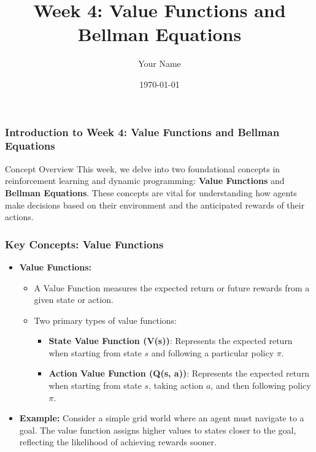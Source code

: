 \documentclass{beamer}
\title{Week 4: Value Functions and Bellman Equations}
\author{Your Name}
\institute{Your Institution}
\date{\today}
\begin{document}
\frame{\titlepage}

\begin{frame}[fragile]
    \titlepage
\end{frame}

\begin{frame}[fragile]
    \frametitle{Introduction to Week 4: Value Functions and Bellman Equations}
    
    \begin{block}{Concept Overview}
        This week, we delve into two foundational concepts in reinforcement learning and dynamic programming: 
        \textbf{Value Functions} and \textbf{Bellman Equations}. 
        These concepts are vital for understanding how agents make decisions 
        based on their environment and the anticipated rewards of their actions.
    \end{block}
\end{frame}

\begin{frame}[fragile]
    \frametitle{Key Concepts: Value Functions}
    
    \begin{itemize}
        \item \textbf{Value Functions:}
        \begin{itemize}
            \item A Value Function measures the expected return or future rewards 
            from a given state or action.
            \item Two primary types of value functions:
            \begin{itemize}
                \item \textbf{State Value Function (V(s))}: 
                Represents the expected return when starting from state \(s\) and following a particular policy \(\pi\).
                
                \item \textbf{Action Value Function (Q(s, a))}: 
                Represents the expected return when starting from state \(s\), taking action \(a\), 
                and then following policy \(\pi\).
            \end{itemize}
        \end{itemize}
        
        \item \textbf{Example:}
        Consider a simple grid world where an agent must navigate to a goal. 
        The value function assigns higher values to states closer to the goal, 
        reflecting the likelihood of achieving rewards sooner.
    \end{itemize}
\end{frame}
\end{document}
